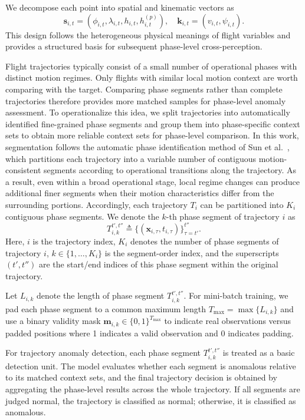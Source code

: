 \documentclass[iicol,pdflatex,sn-basic,Numbered]{sn-jnl}%
\theoremstyle{thmstyleone}%
\theoremstyle{thmstyletwo}%
\theoremstyle{thmstylethree}%
\begin{document}
We decompose each point into spatial and kinematic vectors as
\begin{equation}
\label{eq:decomposition}
\mathbf{s}_{i,t} = (\phi_{i,t}, \lambda_{i,t}, h_{i,t}, h^{(p)}_{i,t}), \quad \mathbf{k}_{i,t} = (v_{i,t}, \psi_{i,t}).
\end{equation}
This design follows the heterogeneous physical meanings of flight variables and provides a structured basis for subsequent phase-level cross-perception.

Flight trajectories typically consist of a small number of operational phases with distinct motion regimes. 
Only flights with similar local motion context are worth comparing with the target.
Comparing phase segments rather than complete trajectories therefore provides more matched samples for phase-level anomaly assessment.
To operationalize this idea, we split trajectories into automatically identified fine-grained phase segments and group them into phase-specific context sets to obtain more reliable context sets for phase-level comparison.
In this work, segmentation follows the automatic phase identification method of Sun et al.~\cite{sun2017phaseidentification}, which partitions each trajectory into a variable number of contiguous motion-consistent segments according to operational transitions along the trajectory. 
As a result, even within a broad operational stage, local regime changes can produce additional finer segments when their motion characteristics differ from the surrounding portions. 
Accordingly, each trajectory $T_i$ can be partitioned into $K_i$ contiguous phase segments.
We denote the $k$-th phase segment of trajectory $i$ as
\begin{equation}
T^{t',t''}_{i,k} \triangleq \{(\mathbf{x}_{i,\tau}, t_{i,\tau})\}_{\tau=t'}^{t''}.
\end{equation}
Here, $i$ is the trajectory index, $K_i$ denotes the number of phase segments of trajectory $i$, $k \in\{1,\ldots,K_i\}$ is the segment-order index, and the superscripts $(t',t'')$ are the start/end indices of this phase segment within the original trajectory.

Let $L_{i,k}$ denote the length of phase segment $T^{t',t''}_{i,k}$.
For mini-batch training, we pad each phase segment to a common maximum length
$T_{\max}=\max\{L_{i,k}\}$ and use a binary validity mask $\mathbf{m}_{i,k}\in\{0,1\}^{T_{\max}}$ to indicate real observations versus padded positions where 1 indicates a valid observation and 0 indicates padding.

For trajectory anomaly detection, each phase segment $T^{t',t''}_{i,k}$ is treated as a basic detection unit.
The model evaluates whether each segment is anomalous relative to its matched context sets, and the final trajectory decision is obtained by aggregating the phase-level results across the whole trajectory.
If all segments are judged normal, the trajectory is classified as normal; otherwise, it is classified as anomalous.
\end{document}
